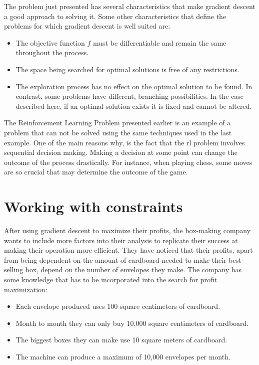 The problem just presented has several characteristics that make gradient
descent a good approach to solving it. Some other characteristics that define
the problems for which gradient descent is well suited are:
\begin{itemize}
    \item The objective function $f$ must be differentiable and remain the same
        throughout the process.
    \item The space being searched for optimal solutions is free of any
        restrictions.
    \item The exploration process has no effect on the optimal solution to be
        found. In contrast, some problems have different, branching possibilities.
        In the case described here, if an optimal solution exists it is fixed and
        cannot be altered.
\end{itemize}
The Reinforcement Learning Problem presented earlier is an example of a problem
that can not be solved using the same techniques used in the last example. One
of the main reasons why, is the fact that the \ac{rl} problem involves
sequential decision making. Making a decision at some point can change the
outcome of the process drastically. For instance, when playing chess, some moves
are so crucial that may determine the outcome of the game.

\section{Working with constraints}

After using gradient descent to maximize their profits, the box-making company
wants to include more factors into their analysis to replicate their success at
making their operation more efficient. They have noticed that their profits,
apart from being dependent on the amount of cardboard needed to make their
best-selling box, depend on the number of envelopes they make. The company has
some knowledge that has to be incorporated into the search for profit
maximization:
\begin{itemize}
    \item Each envelope produced uses 100 square centimeters of cardboard.
    \item Month to month they can only buy 10,000 square centimeters of cardboard.
    \item The biggest boxes they can make use 10 square meters of cardboard.
    \item The machine can produce a maximum of 10,000 envelopes per month.
\end{itemize}


